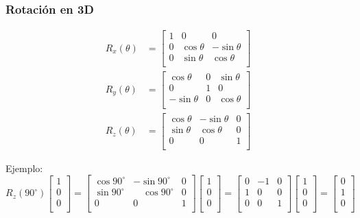 \begin{frame}
    \frametitle{Rotación en 3D}
    \small
    \begin{equation*}
        {\displaystyle {\begin{alignedat}{1}R_{x}(\theta )&={\begin{bmatrix}1&0&0\\0&\cos \theta &-\sin \theta \\[3pt]0&\sin \theta     &\cos \theta \\[3pt]\end{bmatrix}}\\
                    R_{y}(\theta )&={\begin{bmatrix}\cos \theta &0&\sin \theta \\[3pt]0&1&0\\[3pt]-\sin \theta &0&\cos \theta \\
                    \end{bmatrix}}\\
                    R_{z}(\theta )&={\begin{bmatrix}\cos \theta &-\sin \theta &0\\[3pt]\sin \theta &\cos \theta &0\\[3pt]0&0&1\\\end{bmatrix}}\end{alignedat}}
        }
    \end{equation*}

    Ejemplo:
    \begin{equation*}
        {\displaystyle R_{z}(90^{\circ }){\begin{bmatrix}1\\0\\0\\\end{bmatrix}}={\begin{bmatrix}\cos 90^{\circ }&-\sin 90^{\circ }&0\\\sin 90^{\circ }&\quad \cos 90^{\circ }&0\\0&0&1\\\end{bmatrix}}{\begin{bmatrix}1\\0\\0\\\end{bmatrix}}={\begin{bmatrix}0&-1&0\\1&0&0\\0&0&1\\\end{bmatrix}}{\begin{bmatrix}1\\0\\0\\\end{bmatrix}}={\begin{bmatrix}0\\1\\0\\\end{bmatrix}}}
    \end{equation*}

\end{frame}

